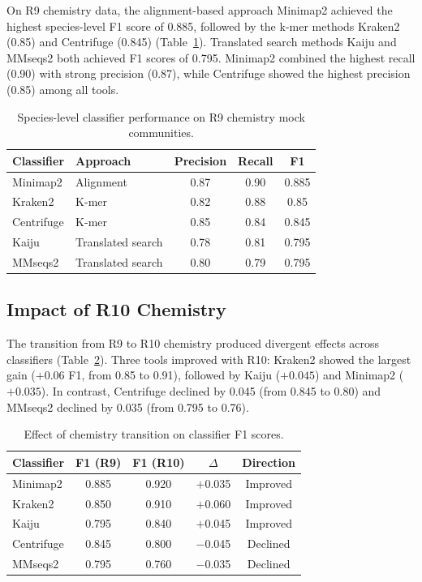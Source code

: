 \documentclass[11pt]{article}
\begin{document}
On R9 chemistry data, the alignment-based approach Minimap2 achieved the highest species-level F1 score of 0.885, followed by the k-mer methods Kraken2 (0.85) and Centrifuge (0.845) (Table~\ref{tab:r9}). Translated search methods Kaiju and MMseqs2 both achieved F1 scores of 0.795. Minimap2 combined the highest recall (0.90) with strong precision (0.87), while Centrifuge showed the highest precision (0.85) among all tools.

\begin{table}[h]
\centering
\caption{Species-level classifier performance on R9 chemistry mock communities.}
\label{tab:r9}
\begin{tabular}{llccc}
\toprule
Classifier & Approach & Precision & Recall & F1 \\
\midrule
Minimap2 & Alignment & 0.87 & 0.90 & 0.885 \\
Kraken2 & K-mer & 0.82 & 0.88 & 0.85 \\
Centrifuge & K-mer & 0.85 & 0.84 & 0.845 \\
Kaiju & Translated search & 0.78 & 0.81 & 0.795 \\
MMseqs2 & Translated search & 0.80 & 0.79 & 0.795 \\
\bottomrule
\end{tabular}
\end{table}

\subsection{Impact of R10 Chemistry}

The transition from R9 to R10 chemistry produced divergent effects across classifiers (Table~\ref{tab:chemistry}). Three tools improved with R10: Kraken2 showed the largest gain ($+0.06$ F1, from 0.85 to 0.91), followed by Kaiju ($+0.045$) and Minimap2 ($+0.035$). In contrast, Centrifuge declined by 0.045 (from 0.845 to 0.80) and MMseqs2 declined by 0.035 (from 0.795 to 0.76).

\begin{table}[h]
\centering
\caption{Effect of chemistry transition on classifier F1 scores.}
\label{tab:chemistry}
\begin{tabular}{lcccc}
\toprule
Classifier & F1 (R9) & F1 (R10) & $\Delta$ & Direction \\
\midrule
Minimap2 & 0.885 & 0.920 & $+$0.035 & Improved \\
Kraken2 & 0.850 & 0.910 & $+$0.060 & Improved \\
Kaiju & 0.795 & 0.840 & $+$0.045 & Improved \\
Centrifuge & 0.845 & 0.800 & $-$0.045 & Declined \\
MMseqs2 & 0.795 & 0.760 & $-$0.035 & Declined \\
\bottomrule
\end{tabular}
\end{table}
\end{document}
